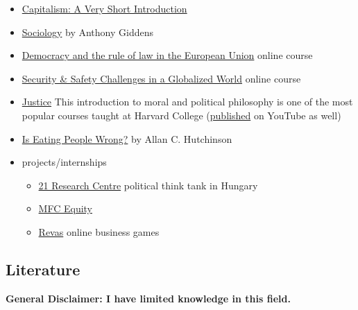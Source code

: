 \documentclass{article}
\begin{document}
\begin{itemize}
    \item \href{https://www.veryshortintroductions.com/view/10.1093/actrade/9780198726074.001.0001/actrade-9780198726074}{Capitalism: A Very Short Introduction}
    \item \href{https://www.goodreads.com/book/show/46423.Sociology}{Sociology} by Anthony Giddens
    \item \href{https://reconnect-europe.eu/mooc/}{Democracy and the rule of law in the European Union} online course
    \item \href{https://www.coursera.org/learn/security-safety-globalized-world}{Security \& Safety Challenges in a Globalized World} online course
    \item \href{https://www.edx.org/course/justice-2}{Justice} This introduction to moral and political philosophy is one of the most popular courses taught at Harvard College
    (\href{https://www.youtube.com/watch?v=kBdfcR-8hEY}{published} on YouTube as well)
    \item \href{https://www.goodreads.com/en/book/show/10428480-is-eating-people-wrong}{Is Eating People Wrong?}  by Allan C. Hutchinson
    \item projects/internships
    \begin{itemize}
        \item \href{https://21kutatokozpont.hu/index.html}{21 Research Centre} political think tank in Hungary
        \item \href{https://mfcequity.com/}{MFC Equity}
        \item \href{https://www.revas.online/en/}{Revas} online business games
    \end{itemize}
\end{itemize}

\subsection{Literature}
\textbf{General Disclaimer: I have limited knowledge in this field.}
\end{document}
